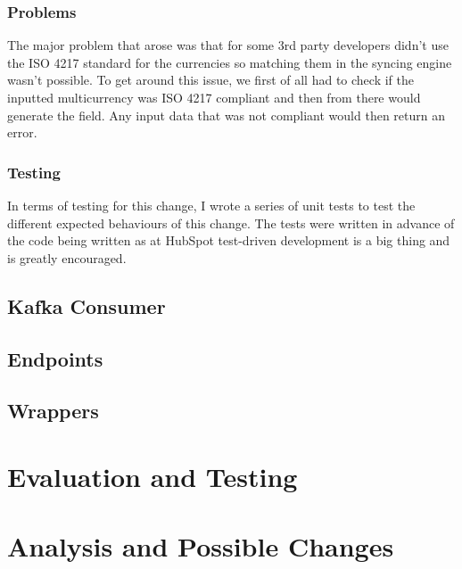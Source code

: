 \subsubsection{Problems} 
The major problem that arose was that for some 3rd party developers didn't use the ISO 4217 standard for the currencies so matching them in the syncing engine wasn't possible.  \newline To get around this issue,  we first of all had to check if the inputted multicurrency was ISO 4217 compliant and then from there would generate the field.  Any input data that was not compliant would then return an error.

\subsubsection{Testing}
In terms of testing for this change,  I wrote a series of unit tests to test the different expected behaviours of this change.  The tests were written in advance of the code being written as at HubSpot test-driven development is a big thing and is greatly encouraged. 

\subsection{Kafka Consumer}
\subsection{Endpoints}
\subsection{Wrappers}

\section{Evaluation and Testing}
\section{Analysis and Possible Changes}
